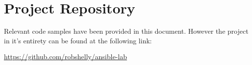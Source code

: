 \section{Project Repository} \label{code}
Relevant code samples have been provided in this document. However the project in it's entirety can be found at the following link:

\noindent \href{https://github.com/robshelly/ansible-lab}{https://github.com/robshelly/ansible-lab}